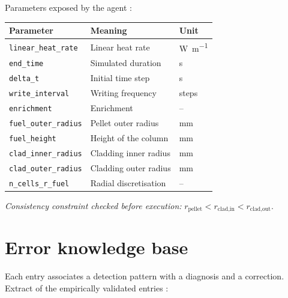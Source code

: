 \documentclass[12pt,a4paper]{report}
\begin{document}
\vspace{0.6cm}

\noindent Parameters exposed by the agent :

\vspace{0.3cm}
\noindent
\begin{tabularx}{\textwidth}{@{}lXl@{}}
\toprule
\textbf{Parameter} & \textbf{Meaning} & \textbf{Unit}\\
\midrule
\texttt{linear\_heat\_rate} & Linear heat rate & \si{\watt\per\metre}\\
\texttt{end\_time} & Simulated duration & \si{\second}\\
\texttt{delta\_t} & Initial time step & \si{\second}\\
\texttt{write\_interval} & Writing frequency & steps\\
\texttt{enrichment} & Enrichment & --\\
\texttt{fuel\_outer\_radius} & Pellet outer radius & \si{\milli\metre}\\
\texttt{fuel\_height} & Height of the column & \si{\milli\metre}\\
\texttt{clad\_inner\_radius} & Cladding inner radius & \si{\milli\metre}\\
\texttt{clad\_outer\_radius} & Cladding outer radius & \si{\milli\metre}\\
\texttt{n\_cells\_r\_fuel} & Radial discretisation & --\\
\bottomrule
\end{tabularx}

\vspace{0.4cm}
\noindent
\textit{Consistency constraint checked before execution:}
$r_{\text{pellet}} < r_{\text{clad,in}} < r_{\text{clad,out}}$.

\section{Error knowledge base}
\label{ann:errkb}

\noindent Each entry associates a detection pattern with a diagnosis and a
correction. Extract of the empirically validated entries :
\end{document}
